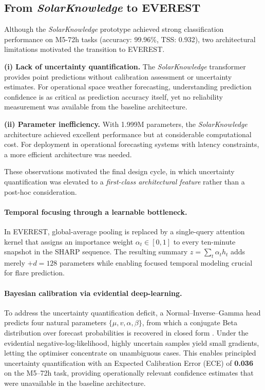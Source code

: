 \subsection{From \textit{SolarKnowledge} to \textsc{EVEREST}}
\label{sec:sk2ev-transition}
Although the \textit{SolarKnowledge} prototype achieved strong classification performance on M5-72h tasks (accuracy: 99.96\%, TSS: 0.932), two architectural limitations motivated the transition to \textsc{EVEREST}.

\textbf{(i) Lack of uncertainty quantification.}
The \textit{SolarKnowledge} transformer provides point predictions without calibration assessment or uncertainty estimates. For operational space weather forecasting, understanding prediction confidence is as critical as prediction accuracy itself, yet no reliability measurement was available from the baseline architecture.

\textbf{(ii) Parameter inefficiency.}
With 1.999M parameters, the \textit{SolarKnowledge} architecture achieved excellent performance but at considerable computational cost. For deployment in operational forecasting systems with latency constraints, a more efficient architecture was needed.

These observations motivated the final design cycle, in which uncertainty quantification was elevated to a \emph{first-class architectural feature} rather than a post-hoc consideration.

\paragraph{Temporal focusing through a learnable bottleneck.}
In \textsc{EVEREST}, global-average pooling is replaced by a single-query attention kernel that assigns an importance weight $\alpha_t\!\in\![0,1]$ to every ten-minute snapshot in the SHARP sequence. The resulting summary $z=\sum_{t}\alpha_{t}h_{t}$ adds merely $+d=128$ parameters while enabling focused temporal modeling crucial for flare prediction.

\paragraph{Bayesian calibration via evidential deep-learning.}
To address the uncertainty quantification deficit, a Normal–Inverse–Gamma head predicts four natural parameters $\{\mu,v,\alpha,\beta\}$, from which a conjugate Beta distribution over forecast probabilities is recovered in closed form \citep{sensoy2018evidential}. Under the evidential negative-log-likelihood, highly uncertain samples yield small gradients, letting the optimiser concentrate on unambiguous cases. This enables principled uncertainty quantification with an Expected Calibration Error (ECE) of \textbf{0.036} on the M5–72h task, providing operationally relevant confidence estimates that were unavailable in the baseline architecture.

